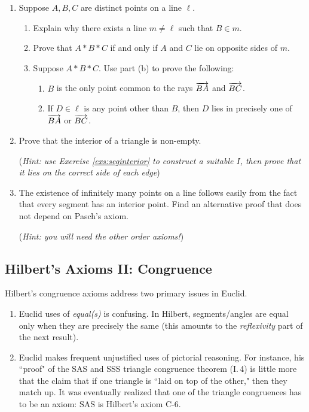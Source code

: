\begin{exercises}
\begin{enumerate}
	  
	  \item Suppose $A,B,C$ are distinct points on a line $\ell$.
	  \begin{enumerate}
	    \item Explain why there exists a line $m\neq \ell$ such that $B\in m$.
	    \item Prove that $A*B*C$ if and only if $A$ and $C$ lie on opposite sides of $m$.
	    \item Suppose $A*B*C$. Use part (b) to prove the following:
	    \begin{enumerate}
				\item $B$ is the only point common to the rays $\overrightarrow{BA}$ and $\overrightarrow{BC}$.
				\item If $D\in\ell$ is any point other than $B$, then $D$ lies in precisely one of $\overrightarrow{BA}$ or $\overrightarrow{BC}$.
			\end{enumerate}
	  \end{enumerate}
	  
	  
	  \item\label{exs:seginfinite} Prove that the interior of a triangle is non-empty.\par
	  (\emph{Hint: use Exercise \ref{exs:seginterior} to construct a suitable $I$, then prove that it lies on the correct side of each edge})
	  
	  
	  \item The existence of infinitely many points on a line follows easily from the fact that every segment has an interior point. Find an alternative proof that does not depend on Pasch's axiom.\par
	  (\emph{Hint: you will need the other order axioms!})
	  
	\end{enumerate}
\end{exercises}


\clearpage




\subsection{Hilbert's Axioms II: Congruence}\label{sec:hilbert2}

Hilbert's congruence axioms address two primary issues in Euclid.
\begin{enumerate}
  \item Euclid uses of \emph{equal(s)} is confusing. In Hilbert, segments/angles are equal only when they are precisely the same (this amounts to the \emph{reflexivity} part of the next result).
  \item Euclid makes frequent unjustified uses of pictorial reasoning. For instance, his ``proof" of the SAS and SSS triangle congruence theorem (I.\,4) is little more that the claim that if one triangle is ``laid on top of the other," then they match up. It was eventually realized that one of the triangle congruences has to be an axiom: SAS is Hilbert's axiom C-6.
\end{enumerate}

